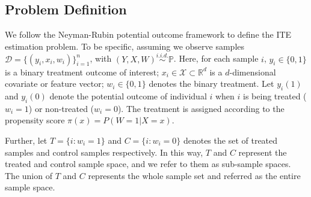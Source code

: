 \documentclass[sigconf]{acmart}
\begin{document}
\subsection{Problem Definition}
\label{problem def}
We follow the Neyman-Rubin potential outcome framework \cite{Rubin2005CausalIU} to define the ITE estimation problem. To be specific, assuming we observe samples $\mathcal{D}=\{(y_i, x_i, w_i)\}^n_{i=1}$, with $(Y, X, W) \stackrel{i.i.d.}{\sim} \mathbb{P}$. Here, for each sample $i$, $y_i \in \{0, 1\}$ is a binary treatment outcome of interest; $x_i \in \mathcal{X} \subset \mathbb{R}^d$ is a $d$-dimensional covariate or feature vector; $w_i\in \{0, 1\}$ denotes the binary treatment. Let $y_i(1)$ and $y_i(0)$ denote the potential outcome of individual $i$ when $i$ is being treated ($w_i = 1$) or non-treated ($w_i = 0$). The treatment is assigned according to the propensity score $\pi(x) = P(W=1|X=x) $. 

Further, let $T= \{i: w_i = 1\}$ and $C= \{i: w_i = 0\}$ denotes the set of treated samples and control samples respectively. In this way, $T$ and $C$ represent the treated and control sample space, and we refer to them as sub-sample spaces. The union of $T$ and $C$ represents the whole sample set and referred as the entire sample space.
\end{document}
